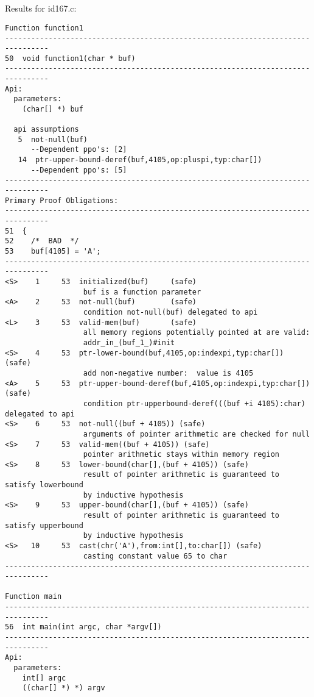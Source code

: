 \documentclass[11pt]{article}
\begin{document}
Results for id167.c:
\begin{small}
\begin{verbatim}
Function function1
--------------------------------------------------------------------------------
50  void function1(char * buf)
--------------------------------------------------------------------------------
Api:
  parameters:
    (char[] *) buf

  api assumptions
   5  not-null(buf)
      --Dependent ppo's: [2]
   14  ptr-upper-bound-deref(buf,4105,op:pluspi,typ:char[])
      --Dependent ppo's: [5]
--------------------------------------------------------------------------------
Primary Proof Obligations:
--------------------------------------------------------------------------------
51  {
52    /*  BAD  */
53    buf[4105] = 'A';
--------------------------------------------------------------------------------
<S>    1     53  initialized(buf)     (safe)
                  buf is a function parameter
<A>    2     53  not-null(buf)        (safe)
                  condition not-null(buf) delegated to api
<L>    3     53  valid-mem(buf)       (safe)
                  all memory regions potentially pointed at are valid: 
                  addr_in_(buf_1_)#init
<S>    4     53  ptr-lower-bound(buf,4105,op:indexpi,typ:char[]) (safe)
                  add non-negative number:  value is 4105
<A>    5     53  ptr-upper-bound-deref(buf,4105,op:indexpi,typ:char[]) (safe)
                  condition ptr-upperbound-deref(((buf +i 4105):char) delegated to api
<S>    6     53  not-null((buf + 4105)) (safe)
                  arguments of pointer arithmetic are checked for null
<S>    7     53  valid-mem((buf + 4105)) (safe)
                  pointer arithmetic stays within memory region
<S>    8     53  lower-bound(char[],(buf + 4105)) (safe)
                  result of pointer arithmetic is guaranteed to satisfy lowerbound 
                  by inductive hypothesis
<S>    9     53  upper-bound(char[],(buf + 4105)) (safe)
                  result of pointer arithmetic is guaranteed to satisfy upperbound 
                  by inductive hypothesis
<S>   10     53  cast(chr('A'),from:int[],to:char[]) (safe)
                  casting constant value 65 to char
--------------------------------------------------------------------------------

Function main
--------------------------------------------------------------------------------
56  int main(int argc, char *argv[])
--------------------------------------------------------------------------------
Api:
  parameters:
    int[] argc
    ((char[] *) *) argv


\end{verbatim}
\end{small}
\end{document}
